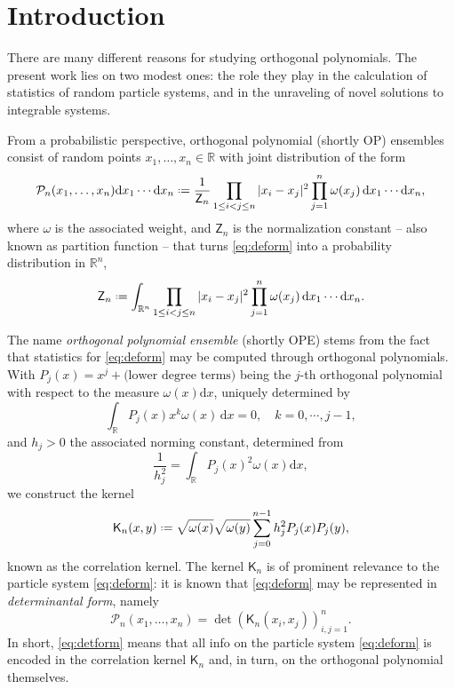 \documentclass[reqno,a4paper,11pt]{amsart}
\newcommand{\R}{\mathbb{R}}
\newcommand{\dd}{\mathrm{d}}
\newcommand*{\deff}{\mathrel{\vcenter{\baselineskip0.5ex \lineskiplimit0pt
                     \hbox{\scriptsize.}\hbox{\scriptsize.}}}%
                     =}
\newcommand{\mcal}{\mathcal}
\newcommand{\msf}{\mathsf}
\theoremstyle{definition}
\theoremstyle{remark}
\numberwithin{equation}{section}
\begin{document}

\vspace*{-1.6cm}

\maketitle

\setcounter{tocdepth}{2} \tableofcontents 

\section{Introduction}

There are many different reasons for studying orthogonal polynomials. The present work lies on two modest ones: the role they play in the calculation of statistics of random particle systems, and in the unraveling of novel solutions to integrable systems.

From a probabilistic perspective, orthogonal polynomial (shortly OP) ensembles consist of random points $x_1,\hdots, x_n\in \R$ with joint distribution of the form
\begin{equation}\label{eq:deform}
\mcal P_n(x_1,\hdots,x_n) \dd x_1\cdots \dd x_n\deff \frac{1}{\msf Z_n}\prod_{1\leq i<j\leq n}|x_i-x_j|^2 \prod_{j=1}^n \omega(x_j)\, \dd x_1\cdots \dd x_n,
\end{equation}
%
where $\omega$ is the associated weight, and $\msf Z_n$ is the normalization constant -- also known as partition function -- that turns \eqref{eq:deform} into a probability distribution in $\R^n$,
%
$$
\msf Z_n\deff \int_{\R^n} \prod_{1\leq i<j\leq n}|x_i-x_j|^2 \prod_{j=1}^n \omega(x_j)\, \dd x_1 \cdots \dd x_n.
$$

The name {\it orthogonal polynomial ensemble} (shortly OPE) stems from the fact that statistics for \eqref{eq:deform} may be computed through orthogonal polynomials. With $P_j(x)=x^j+\text{(lower degree terms)}$ being the $j$-th orthogonal polynomial with respect to the measure $\omega(x)\dd x$, uniquely determined by
%
$$
\int_\R P_j(x)x^k\omega(x) \, \dd x=0,\quad k=0,\cdots, j-1,
$$
%
and $h_j>0$ the associated norming constant, determined from
%
$$
\frac{1}{h_j^2}=\int_{\R} P_j(x)^2\omega(x)\dd x,
$$
%
we construct the kernel
%
\begin{equation}\label{deff:corrkernel}
\msf K_n(x,y)
     \deff \sqrt{\omega(x)} \sqrt{\omega(y)}\sum_{j=0}^{n-1}h_j^2P_j(x)P_j(y),
\end{equation}
%
known as the correlation kernel. The kernel $\msf K_n$ is of prominent relevance to the particle system \eqref{eq:deform}: it is known that \eqref{eq:deform} may be represented in {\it determinantal form}, namely
%
\begin{equation}\label{eq:detform}
\mcal P_n(x_1,\hdots,x_n) =\det\left( \msf K_n(x_i,x_j) \right)_{i,j=1}^n.
\end{equation}
%
In short, \eqref{eq:detform} means that all info on the particle system \eqref{eq:deform} is encoded in the correlation kernel $\msf K_n$ and, in turn, on the orthogonal polynomial themselves.
\end{document}
